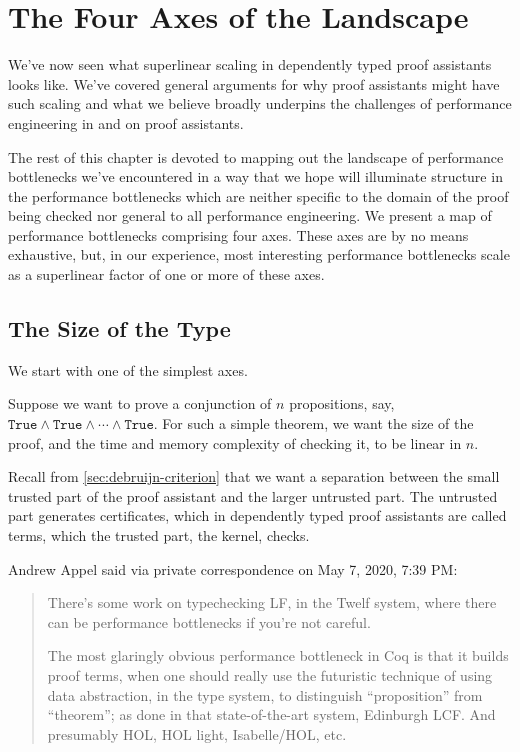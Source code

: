 \section{The Four Axes of the Landscape}\label{sec:perf-axes}

We've now seen what superlinear scaling in dependently typed proof assistants looks like.
We've covered general arguments for why proof assistants might have such scaling and what we believe broadly underpins the challenges of performance engineering in and on proof assistants.

The rest of this chapter is devoted to mapping out the landscape of performance bottlenecks we've encountered in a way that we hope will illuminate structure in the performance bottlenecks which are neither specific to the domain of the proof being checked nor general to all performance engineering.
We present a map of performance bottlenecks comprising four axes.
These axes are by no means exhaustive, but, in our experience, most interesting performance bottlenecks scale as a superlinear factor of one or more of these axes.

\subsection{The Size of the Type} \label{sec:perf-axis:size-of-type}  \label{sec:quadratic-conj-certificate}

We start with one of the simplest axes.

Suppose we want to prove a conjunction of $n$ propositions, say, $\texttt{True} \wedge \texttt{True} \wedge \cdots \wedge \texttt{True}$.
For such a simple theorem, we want the size of the proof, and the time and memory complexity of checking it, to be linear in $n$.

Recall from \autoref{sec:debruijn-criterion} that we want a separation between the small trusted part of the proof assistant and the larger untrusted part.
The untrusted part generates certificates, which in dependently typed proof assistants are called terms, which the trusted part, the kernel, checks.

%
\begin{minorcomment}
Andrew Appel said via private correspondence on May 7, 2020, 7:39 PM:
\begin{quotation}
There's some work on typechecking LF, in the Twelf system, where there can be performance bottlenecks if you're not careful.

The most glaringly obvious performance bottleneck in Coq is that it builds proof terms, when one should really use the futuristic technique of using data abstraction, in the type system, to distinguish ``proposition'' from ``theorem''; as done in that state-of-the-art system, Edinburgh LCF.  And presumably HOL, HOL light, Isabelle/HOL, etc.
\end{quotation}
\end{minorcomment}
%
%

